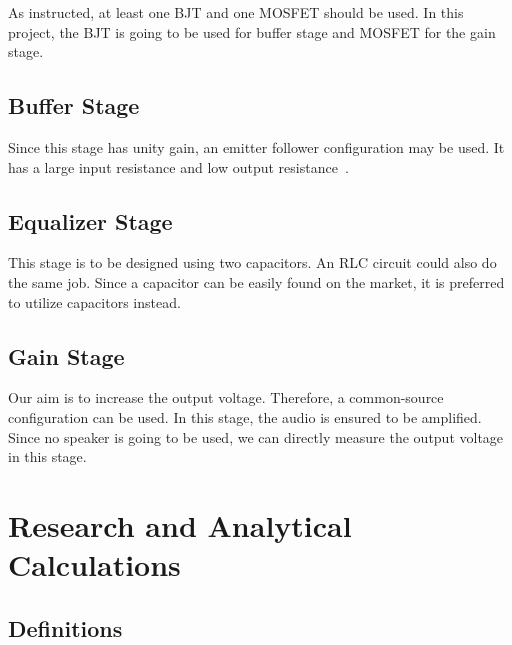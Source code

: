 \documentclass[12pt, a4paper]{article}
\numberwithin{table}{section}
\numberwithin{figure}{section}
\begin{document}
As instructed, at least one BJT and one MOSFET should be used. In this project, the BJT is going to be used for buffer stage and MOSFET for the gain stage.

\subsection{Buffer Stage}

Since this stage has unity gain, an emitter follower configuration may be used. It has a large input resistance and low output resistance~\cite{1}.

\subsection{Equalizer Stage}

This stage is to be designed using two capacitors. An RLC circuit could also do the same job. Since a capacitor can be easily found on the market, it is preferred to utilize capacitors instead.

\subsection{Gain Stage}

Our aim is to increase the output voltage. Therefore, a common-source configuration can be used. In this stage, the audio is ensured to be amplified. Since no speaker is going to be used, we can directly measure the output voltage in this stage.

\section{Research and Analytical Calculations}

\subsection{Definitions}
\end{document}
